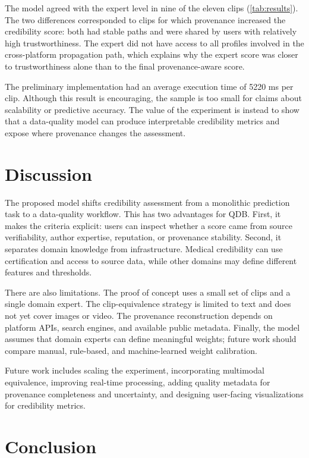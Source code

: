 \documentclass[sigconf, nonacm]{acmart}
\begin{document}
The model agreed with the expert level in nine of the eleven clips
(\autoref{tab:results}). The two differences corresponded to clips for which
provenance increased the credibility score: both had stable paths and were shared
by users with relatively high trustworthiness. The expert did not have access to
all profiles involved in the cross-platform propagation path, which explains why
the expert score was closer to trustworthiness alone than to the final
provenance-aware score.

The preliminary implementation had an average execution time of 5220 ms per clip.
Although this result is encouraging, the sample is too small for claims about
scalability or predictive accuracy. The value of the experiment is instead to show
that a data-quality model can produce interpretable credibility metrics and expose
where provenance changes the assessment.

\section{Discussion}

The proposed model shifts credibility assessment from a monolithic prediction task
to a data-quality workflow. This has two advantages for QDB. First, it makes the
criteria explicit: users can inspect whether a score came from source
verifiability, author expertise, reputation, or provenance stability. Second, it
separates domain knowledge from infrastructure. Medical credibility can use
certification and access to source data, while other domains may define different
features and thresholds.

There are also limitations. The proof of concept uses a small set of clips and a
single domain expert. The clip-equivalence strategy is limited to text and does not
yet cover images or video. The provenance reconstruction depends on platform APIs,
search engines, and available public metadata. Finally, the model assumes that
domain experts can define meaningful weights; future work should compare manual,
rule-based, and machine-learned weight calibration.

Future work includes scaling the experiment, incorporating multimodal equivalence,
improving real-time processing, adding quality metadata for provenance completeness
and uncertainty, and designing user-facing visualizations for credibility metrics.

\section{Conclusion}
\end{document}
